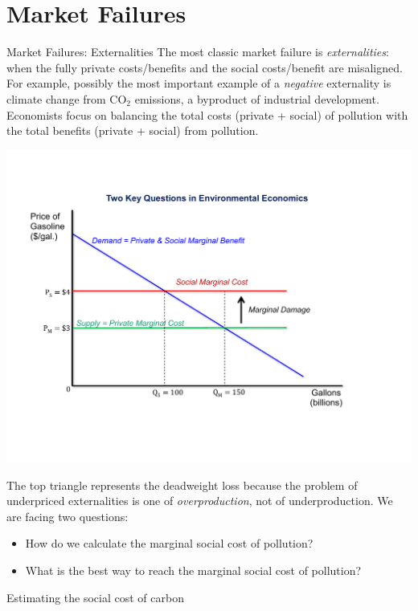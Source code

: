 \documentclass[10pt]{extarticle}
\begin{document}
  \section*{Market Failures}%
  \begin{problem}{Market Failures: Externalities}
    The most classic market failure is \textit{externalities}: when the fully private costs/benefits and the social costs/benefit are misaligned. For example, possibly the most important example of a \textit{negative} externality is climate change from CO$_2$ emissions, a byproduct of industrial development.\\

    Economists focus on balancing the total costs (private + social) of pollution with the total benefits (private + social) from pollution.
    \begin{center}
      \includegraphics[width=\textwidth]{climate_change_externalities.pdf}
    \end{center}
    The top triangle represents the deadweight loss because the problem of underpriced externalities is one of \textit{overproduction}, not of underproduction. We are facing two questions:
    \begin{itemize}
      \item How do we calculate the marginal social cost of pollution?
      \item What is the best way to reach the marginal social cost of pollution?
    \end{itemize}
    \begin{problem}{Estimating the social cost of carbon}
      \begin{description}

\end{description}
\end{problem}
\end{problem}
\end{document}
